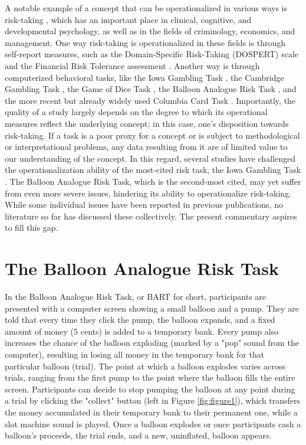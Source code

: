 \documentclass[serif, twocolumn, authordate, meta]{jote-article}
\begin{document}
A notable example of a concept that can be operationalized in various ways is risk-taking \parencite{Lauriola2018}, which has an important place in clinical, cognitive, and developmental psychology, as well as in the fields of criminology, economics, and management. One way risk-taking is operationalized in these fields is through self-report measures, such as the Domain-Specific Risk-Taking (DOSPERT) scale \parencite{Blais2006} and the Financial Risk Tolerance assessment \parencite{Grable1999}. Another way is through computerized behavioral tasks, like the Iowa Gambling Task \parencite{Bechara1994}, the Cambridge Gambling Task \parencite{Rogers1999}, the Game of Dice Task \parencite{Brand2005}, the Balloon Analogue Risk Task \parencite{Lejuez2002}, and the more recent but already widely used Columbia Card Task \parencite{Figner2009}. Importantly, the quality of a study largely depends on the degree to which its operational measures reflect the underlying concept; in this case, one's disposition towards risk-taking. If a task is a poor proxy for a concept or is subject to methodological or interpretational problems, any data resulting from it are of limited value to our understanding of the concept. In this regard, several studies have challenged the operationalization ability of the most-cited risk task, the Iowa Gambling Task \parencite[see e.g.,][]{Brand2006, Buelow2009, Figner2009, Maia2004}. The Balloon Analogue Risk Task, which is the second-most cited, may yet suffer from even more severe issues, hindering its ability to operationalize risk-taking. While some individual issues have been reported in previous publications, no literature so far has discussed these collectively. The present commentary aspires to fill this gap.

{}
\section*{The Balloon Analogue Risk Task}

In the Balloon Analogue Risk Task, or BART for short, participants are presented with a computer screen showing a small balloon and a pump. They are told that every time they click the pump, the balloon expands, and a fixed amount of money (5 cents) is added to a temporary bank. Every pump also increases the chance of the balloon exploding (marked by a "pop" sound from the computer), resulting in losing all money in the temporary bank for that particular balloon (trial). The point at which a balloon explodes varies across trials, ranging from the first pump to the point where the balloon fills the entire screen. Participants can decide to stop pumping the balloon at any point during a trial by clicking the "collect" button (left in Figure \ref{fig:figure1}), which transfers the money accumulated in their temporary bank to their permanent one, while a slot machine sound is played. Once a balloon explodes or once participants cash a balloon's proceeds, the trial ends, and a new, uninflated, balloon appears.
\end{document}
